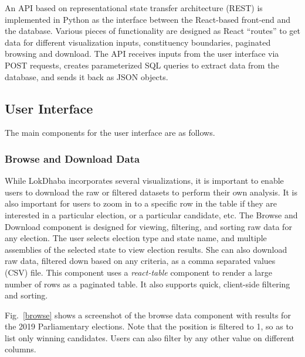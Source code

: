 An API based on representational state transfer architecture (REST) is implemented in Python as the interface between the React-based front-end and the database. Various pieces of functionality are designed as React ``routes'' to get data for different visualization inputs, constituency boundaries, paginated browsing and download. The API receives inputs from the user interface via POST requests, creates parameterized SQL queries to extract data from the database, and sends it back as JSON objects.  

\subsection{User Interface}

The main components for the user interface are as follows.
 
\subsubsection{Browse and Download Data}
 
 While LokDhaba incorporates several visualizations, it is important to enable users to download the raw or filtered datasets to perform their own analysis. It is also important for users to zoom in to a specific row in the table if they are interested in a particular election, or a particular candidate, etc. The Browse and Download component is designed for viewing, filtering, and sorting raw data for any election. The user selects election type and state name, and multiple assemblies of the selected state to view election results. She can also download raw data, filtered down based on any criteria, as a comma separated values (CSV) file. This component uses a \emph{react-table} component to render a large number of rows as a paginated table. It also supports quick, client-side filtering and sorting.
 
 Fig.~\ref{browse} shows a screenshot of the browse data component with results for the 2019 Parliamentary elections. Note that the position is filtered to 1, so as to list only winning candidates. Users can also filter by any other value on different columns.
  
